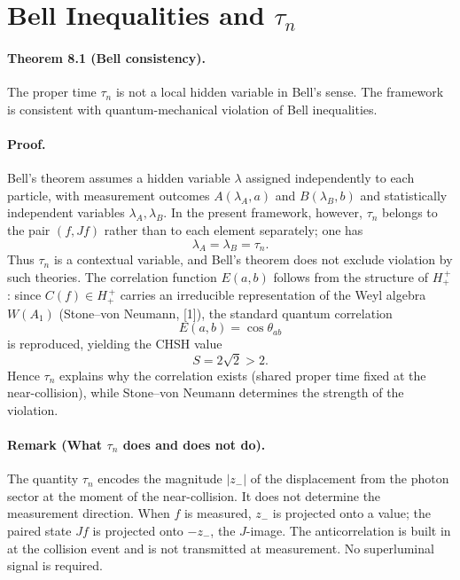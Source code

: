 \section{Bell Inequalities and \texorpdfstring{$\tau_n$}{tau_n}}
\paragraph*{Theorem 8.1 (Bell consistency).}
The proper time $\tau_n$ is not a local hidden variable in Bell's sense. The framework is consistent with quantum-mechanical violation of Bell inequalities.

\paragraph*{Proof.}
Bell's theorem assumes a hidden variable $\lambda$ assigned independently to each particle, with measurement outcomes $A(\lambda_A,a)$ and $B(\lambda_B,b)$ and statistically independent variables $\lambda_A,\lambda_B$. In the present framework, however, $\tau_n$ belongs to the pair $(f,Jf)$ rather than to each element separately; one has
\[
\lambda_A = \lambda_B = \tau_n.
\]
Thus $\tau_n$ is a contextual variable, and Bell's theorem does not exclude violation by such theories. The correlation function $E(a,b)$ follows from the structure of $H_+^{\,+}$: since $C(f) \in H_+^{\,+}$ carries an irreducible representation of the Weyl algebra $W(A_1)$ (Stone--von Neumann, [1]), the standard quantum correlation
\[
E(a,b)=\cos \theta_{ab}
\]
is reproduced, yielding the CHSH value
\[
S = 2\sqrt{2} > 2.
\]
Hence $\tau_n$ explains why the correlation exists (shared proper time fixed at the near-collision), while Stone--von Neumann determines the strength of the violation.

\paragraph*{Remark (What $\tau_n$ does and does not do).}
The quantity $\tau_n$ encodes the magnitude $|z_-|$ of the displacement from the photon sector at the moment of the near-collision. It does not determine the measurement direction. When $f$ is measured, $z_-$ is projected onto a value; the paired state $Jf$ is projected onto $-z_-$, the $J$-image. The anticorrelation is built in at the collision event and is not transmitted at measurement. No superluminal signal is required.

